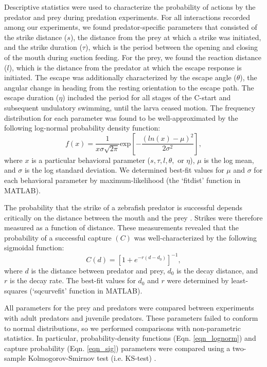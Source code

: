 \documentclass[]{rsos}%
\begin{document}
Descriptive statistics were used to characterize the probability of actions by the predator and prey during predation experiments.
For all interactions recorded among our experiments, we found predator-specific parameters that consisted of the strike distance ($s$), the distance from the prey at which a strike was initiated, and the strike duration ($\tau$), which is the period between the opening and closing of the mouth during suction feeding. 
For the prey, we found the reaction distance ($l$), which is the distance from the predator at which the escape response is initiated.
The escape was additionally characterized by the escape angle ($\theta$), the angular change in heading from the resting orientation to the escape path.
The escape duration ($\eta$) included the period for all stages of the C-start and subsequent undulatory swimming, until the larva ceased motion.
The frequency distribution for each parameter was found to be well-approximated by the following log-normal probability density function:
\begin{equation}%
f(x) = \frac{1}{x\sigma \sqrt{2 \pi}} \text{exp} \left[ -{\frac{(ln(x)-\mu)^2}{2\sigma ^2}} \right],
\label{eqn_lognorm}
\end{equation}
%
where $x$ is a particular behavioral parameter ($s, \tau, l, \theta ,$ or $\eta$), $\mu$ is the log mean, and $\sigma$ is the log standard deviation. 
We determined best-fit values for $\mu$ and $\sigma$ for each behavioral parameter by maximum-likelihood (the `fitdist' function in MATLAB).

The probability that the strike of a zebrafish predator is successful depends critically on the distance between the mouth and the prey \cite{Stewart:2013bha}.
Strikes were therefore measured as a function of distance. 
These measurements revealed that the probability of a successful capture $(C)$ was well-characterized by the following sigmoidal function:
%
\begin{equation}%
C(d) = \left[ 1+e^{-r(d-d_0)} \right]^{-1},
\label{eqn_sig} 
\end{equation}
%
where $d$ is the distance between predator and prey, $d_0$ is the decay distance, and $r$ is the decay rate. 
The best-fit values for $d_0$ and $r$ were determined by least-squares (`sqcurvefit' function in MATLAB).

All parameters for the prey and predators were compared between experiments with adult predators and juvenile predators.
These parameters failed to conform to normal distributions, so we performed comparisons with non-parametric statistics. 
In particular, probability-density functions (Eqn. \ref{eqn_lognorm}) and capture probability (Eqn. \ref{eqn_sig}) parameters were compared using a two-sample Kolmogorov-Smirnov test (i.e. KS-test) \cite{MasseyJr:1951jo}. 
\end{document}
